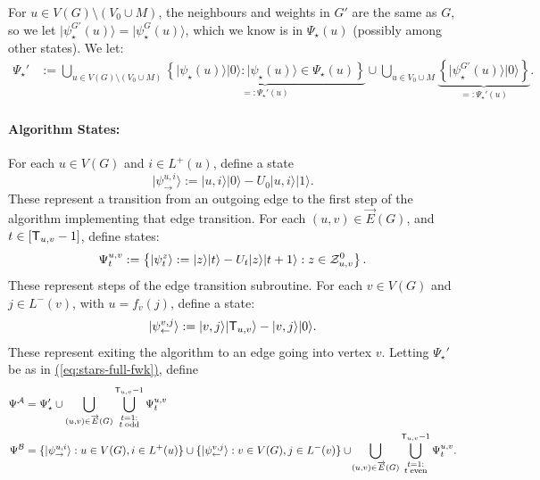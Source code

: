 \documentclass{theoretics}
\newcommand{\eq}[1]{\hyperref[eq:#1]{(\ref*{eq:#1})}}
\def\ket#1{{\lvert}#1\rangle}
\renewcommand{\>}{\rangle}
\newcommand{\<}{\langle}
\renewcommand{\(}{\left(}
\renewcommand{\)}{\right)}
\begin{document}
For $u\in V(G)\setminus (V_0\cup M)$, the neighbours and weights in $G'$ are the same as $G$, so we let $\ket{\psi_\star^{G'}(u)}=\ket{\psi_\star^{G}(u)}$, which we know is in $\Psi_\star(u)$ (possibly among other states).  
We let:
\begin{equation}
\begin{split}
\Psi_{\star}'&:=\bigcup_{u\in V(G)\setminus (V_0\cup M)}\underbrace{\left\{\ket{\psi_{\star}(u)}\ket{0}:\ket{\psi_\star(u)}\in \Psi_\star(u)\right\}}_{=:\Psi_\star'(u)}
\cup
\bigcup_{u\in V_0\cup M}\underbrace{\left\{\ket{\psi_{\star}^{G'}(u)}\ket{0}\right\}}_{=:\Psi_\star'(u)}.\label{eq:stars-full-fwk}
\end{split}
\end{equation}

\paragraph{Algorithm States:} 
For each $u\in V(G)$ and $i\in L^+(u)$, define a state
\begin{equation}
\ket{\psi_{\rightarrow}^{u,i}}:=\ket{u,i}\ket{0} - U_0\ket{u,i}\ket{1}.\label{eq:psi-ui}
\end{equation}
These represent a transition from an outgoing edge to the first step of the algorithm implementing that edge transition. 
For each $(u,v)\in \overrightarrow{E}(G)$, and $t\in [{\sf T}_{u,v}-1]$, define states:
\begin{equation}
\Psi_t^{u,v}:=\left\{\ket{\psi_{t}^z}:=\ket{z}\ket{t} - U_t\ket{z}\ket{t+1}:
z\in {\cal Z}_{u,v}^0\right\}.\label{eq:psi-z-t}
\end{equation}
These represent steps of the edge transition subroutine.
For each $v\in V(G)$ and $j\in L^-(v)$, with $u=f_v(j)$, define a state:
\begin{equation}
\ket{\psi_{\leftarrow}^{v,j}}:=\ket{v,j}\ket{{\sf T}_{u,v}}-\ket{v,j}\ket{0}.\label{eq:psi-vj}
\end{equation}
These represent exiting the algorithm to an edge going into vertex $v$. 
Letting $\Psi_\star'$ be as in \eq{stars-full-fwk}, define
\begin{equation}
\begin{split}
\Psi^{\cal A} &= \Psi_\star'\cup \bigcup_{(u,v)\in\overrightarrow{E}(G)}\bigcup_{\substack{t=1:\\ t\;\mathrm{odd}}}^{{\sf T}_{u,v}-1}\Psi_t^{u,v}\\
\Psi^{\cal B} &=  \{\ket{\psi_{\rightarrow}^{u,i}}:u\in V(G),i\in L^+(u)\}\cup \{\ket{\psi_{\leftarrow}^{v,j}}:v\in V(G), j\in L^-(v)\}\cup \!\bigcup_{(u,v)\in\overrightarrow{E}(G)}\bigcup_{\substack{t=1:\\ t\;\mathrm{even}}}^{{\sf T}_{u,v}-1}\Psi_t^{u,v}.
\end{split}\label{eq:full-fwk-states}
\end{equation}
\end{document}

